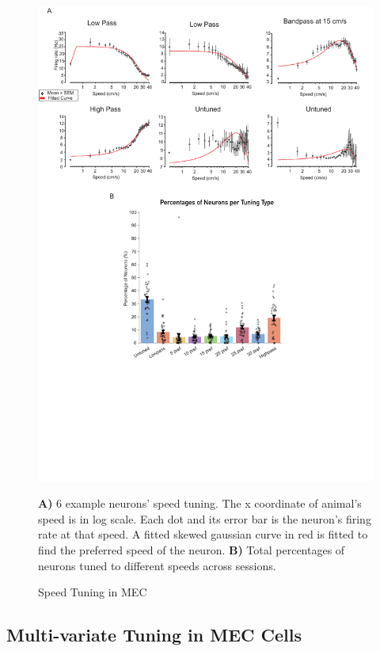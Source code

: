 \begin{figure}
    \centering
    \includegraphics[width=1\linewidth]{figures//Chapter 5 MEC/fig2_speed_tuning.pdf}
    \caption{Speed Tuning in MEC}
    \label{fig:placeholder}
\medskip
\small
\textbf{A)} 6 example neurons' speed tuning. The x coordinate of animal's speed is in log scale. Each dot and its error bar is the neuron's firing rate at that speed. A fitted skewed gaussian curve in red is fitted to find the preferred speed of the neuron. \textbf{B)} Total percentages of neurons tuned to different speeds across sessions.
\end{figure}

\subsection{Multi-variate Tuning in MEC Cells}
